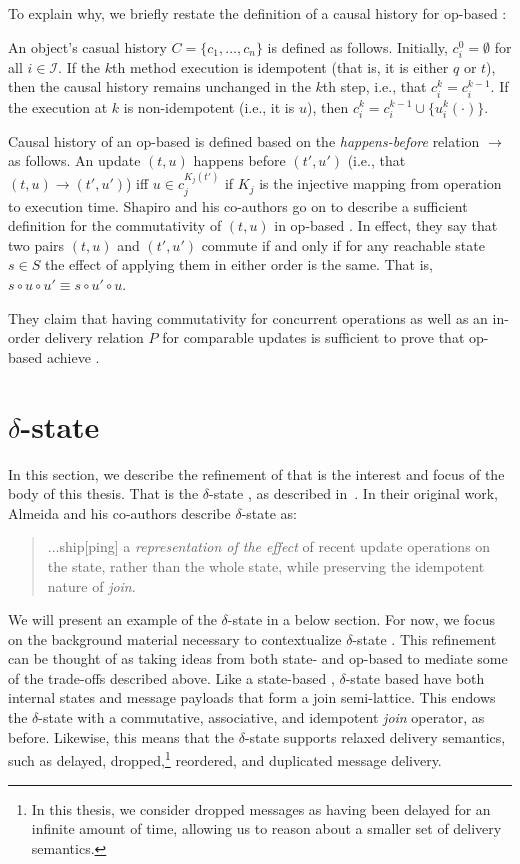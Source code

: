 To explain why, we briefly restate the definition of a causal history for
op-based \CRDTs:

\begin{definition}
An object's casual history $C = \{ c_1, \ldots, c_n \}$ is defined as follows.
Initially, $c_i^0 = \emptyset$ for all $i \in \mathcal{I}$. If the $k$th method
execution is idempotent (that is, it is either $q$ or $t$), then the causal
history remains unchanged in the $k$th step, i.e., that $c_i^k = c_i^{k-1}$. If
the execution at $k$ is non-idempotent (i.e., it is $u$), then $c_i^{k} =
c_i^{k-1} \cup \{ u_i^k(\cdot) \}$.
\end{definition}

Causal history of an op-based \CRDT is defined based on the
\textit{happens-before} relation $\to$ as follows. An update $(t,u)$ happens
before $(t',u')$ (i.e., that $(t, u) \to (t', u')$) iff $u \in c_{j}^{K_j(t')}$
if $K_j$ is the injective mapping from operation to execution time. Shapiro and
his co-authors go on to describe a sufficient definition for the commutativity
of $(t,u)$ in op-based \CRDTs. In effect, they say that two pairs $(t,u)$ and
$(t',u')$ commute if and only if for any reachable state $s \in S$ the effect of
applying them in either order is the same. That is, $s \circ u \circ u' \equiv s
\circ u' \circ u$.

They claim that having commutativity for concurrent operations as well as an
in-order delivery relation $P$ for comparable updates is sufficient to prove
that op-based \CRDTs achieve \SEC.

\section{$\delta$-state \CRDTs}
In this section, we describe the refinement of \CRDTs that is the interest and
focus of the body of this thesis. That is the $\delta$-state \CRDT, as described
in~\citet{almedia18}. In their original work, Almeida and his co-authors
describe $\delta$-state \CRDTs as:
\begin{quote}
...ship[ping] a \textit{representation of the effect} of recent update operations
on the state, rather than the whole state, while preserving the idempotent
nature of \textit{join}.
\end{quote}

We will present an example of the $\delta$-state \CRDT in a below section. For
now, we focus on the background material necessary to contextualize
$\delta$-state \CRDTs. This refinement can be thought of as taking ideas from
both state- and op-based \CRDTs to mediate some of the trade-offs described
above. Like a state-based \CRDT, $\delta$-state based \CRDTs have both internal
states and message payloads that form a join semi-lattice. This endows the
$\delta$-state \CRDT with a commutative, associative, and idempotent \emph{join}
operator, as before. Likewise, this means that the $\delta$-state \CRDT supports
relaxed delivery semantics, such as delayed, dropped,\footnote{In this thesis,
we consider dropped messages as having been delayed for an infinite amount of
time, allowing us to reason about a smaller set of delivery semantics.}
reordered, and duplicated message delivery.

